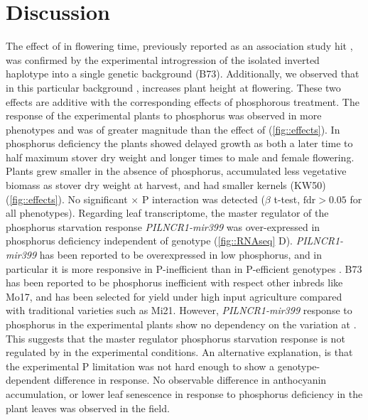 \section{Discussion}

 The effect of \invfour in flowering time, previously reported as an association study hit \citep{romero_navarro2017-cn, barnes2022,gates2019-xu}, was confirmed by the experimental introgression of the isolated inverted haplotype into a single genetic background (B73). 
 Additionally, we observed that in this particular background \invfour, increases plant height at flowering.
 These two effects are additive with the corresponding effects of phosphorous treatment. 
 The response of the experimental plants to phosphorus was observed in more phenotypes and was of greater magnitude than the effect of \invfour (\autoref{fig::effects}). 
 In phosphorus deficiency the plants showed delayed growth as both a later time to half maximum stover dry weight and longer times to male and female flowering.
 Plants grew smaller in the absence of phosphorus, accumulated less vegetative biomass as stover dry weight at harvest, and had smaller kernels (KW50) (\autoref{fig::effects}).
 No significant \invfour $\times$ P interaction was detected ($\beta$ t-test, $\textrm{fdr} > 0.05$ for all phenotypes).
 Regarding leaf transcriptome, the master regulator of the phosphorus starvation response  \textit{PILNCR1-mir399} was over-expressed in phosphorus deficiency independent of \invfour genotype (\autoref{fig::RNAseq} D). 
 \textit{PILNCR1-mir399} has been reported to be overexpressed in low phosphorus, and in particular it is more responsive in P-inefficient than in P-efficient genotypes \citep{du2018}.
 B73 has been reported to be phosphorus inefficient with respect other inbreds like Mo17\citep{zhu2005}, and has been selected for yield under high input agriculture compared with traditional varieties such as Mi21. However, \textit{PILNCR1-mir399} response to phosphorus in the experimental plants show no dependency on the variation at \invfour. 
 This suggests that the master regulator phosphorus starvation response is not regulated by \invfour in the experimental conditions. 
 An alternative explanation, is that the experimental P limitation was not hard enough to show a genotype-dependent difference in response. 
 No observable difference in anthocyanin accumulation, or lower leaf senescence in response to phosphorus deficiency in the plant leaves was observed in the field.

